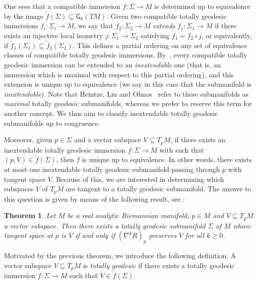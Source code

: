 \documentclass[11pt,a4paper,final]{amsart}
\newcommand{\s}{\mathsf}
\renewcommand{\tilde}{\widetilde}
\newtheorem{theorem}{Theorem}[section]
\theoremstyle{definition}
\begin{document}
One sees that a compatible immersion $f\colon \Sigma \to M$ is determined up to equivalence by the image $\tilde{f}(\Sigma)\subseteq \s{G}_{k}(TM)$.
Given two compatible totally geodesic immersions $f_{i}\colon \Sigma_{i}\to M$, we say that $f_{2}\colon \Sigma_{2}\to M$ \textit{extends} $f_{1}\colon \Sigma_{1}\to M$ if there exists an injective local isometry $j\colon \Sigma_{1}\to \Sigma_{2}$ satisfying $f_{1}=f_{2}\circ j$, or equivalently, if $\tilde{f}_{1}(\Sigma_{1})\subseteq \tilde{f}_{2}(\Sigma_{2})$.
This defines a partial ordering on any set of equivalence classes of compatible totally geodesic immersions.
By~\cite[Proposition~10.3.2]{BerndtConsoleOlmos}, every compatible totally geodesic immersion can be extended to an \textit{inextendable} one (that is, an immersion which is maximal with respect to this partial ordering), and this extension is unique up to equivalence (we say in this case that the submanifold is \textit{inextendable}). Note that Heintze, Liu and Olmos~\cite{HeintzeLiuOlmos} refer to these submanifolds as \textit{maximal} totally geodesic submanifolds, whereas we prefer to reserve this term for another concept.
We thus aim to classify inextendable totally geodesic submanifolds up to congruence.

Moreover, given $p\in \Sigma$ and a vector subspace $V\subseteq T_{p}M$, if there exists an inextendable totally geodesic immersion $f\colon \Sigma \to M$ with such that $(p,V)\in\tilde{f}(\Sigma)$, then $f$ is unique up to equivalence.
In other words, there exists at most one inextendable totally geodesic submanifold passing through $p$ with tangent space $V$.
Because of this, we are interested in determining which subspaces $V$ of $T_{p}M$ are tangent to a totally geodesic submanifold.
The answer to this question is given by means of the following result, see \cite[Section~10.3.2]{BerndtConsoleOlmos}:
\begin{theorem}\label{th:CharacterizationTGSubmanifolds}
	Let $M$ be a real analytic Riemannian manifold, $p\in M$ and $V\subseteq T_{p}M$ a vector subspace.
    Then there exists a totally geodesic submanifold $\Sigma$ of $M$ whose tangent space at $p$ is $V$ if and only if $(\nabla^{k}R)_{p}$ preserves $V$ for all $k\geq 0$.
\end{theorem}

Motivated by the previous theorem, we introduce the following definition.
A vector subspace $V\subseteq T_{p}M$ is \textit{totally geodesic} if there exists a totally geodesic immersion $f\colon \Sigma\to M$ such that $V\in\tilde{f}(\Sigma)$.
\end{document}
